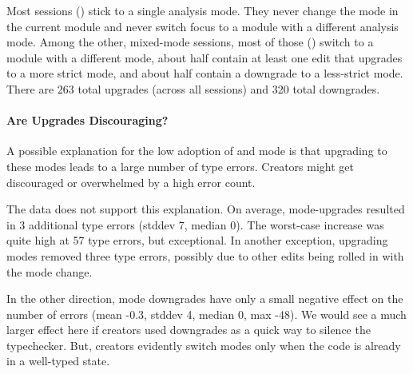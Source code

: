 \documentclass[english,submission,cleveref]{programming}
\begin{document}
Most sessions () stick to a single analysis mode.
They never change the mode in the current module and never
switch focus to a module with a different analysis mode.
Among the other, mixed-mode sessions, most of those () switch to a
module with a different mode, about half contain at least one edit that
upgrades to a more strict mode, and about half contain a downgrade to a
less-strict mode.
There are 263 total upgrades (across all sessions) and 320 total downgrades.


\paragraph{Are Upgrades Discouraging?}


A possible explanation for the low adoption of \mnonstrict{} and
\mstrict{} mode is that upgrading to these modes leads to a large
number of type errors.
Creators might get discouraged or overwhelmed by a high error count.

The data does not support this explanation.
On average, mode-upgrades resulted in 3 additional
type errors (stddev 7, median 0).
The worst-case increase was quite high at 57 type errors, but exceptional.
In another exception, upgrading modes removed three type errors,
possibly due to other edits being rolled in with the
mode change.

In the other direction, mode downgrades have only a small negative effect on the
number of errors (mean -0.3, stddev 4, median 0, max -48).
We would see a much larger effect here if creators used downgrades
as a quick way to silence the typechecker.
But, creators evidently switch modes only when the code is already
in a well-typed state.


\end{document}
